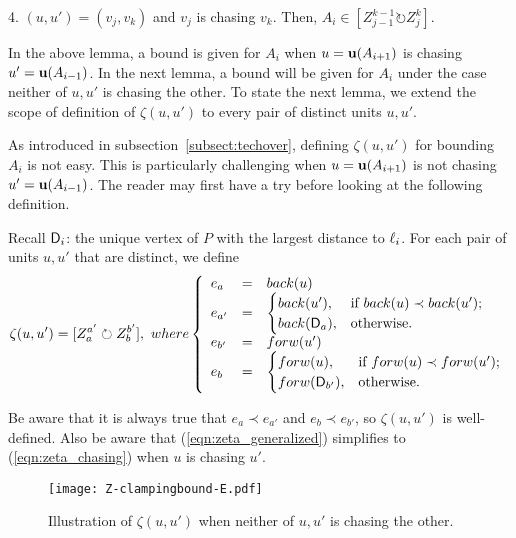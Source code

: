\documentclass{ws-ijcga}
\begin{document}
4. $(u,u')=(v_j,v_k)$ and $v_j$ is chasing $v_k$. Then, $A_i\in [Z_{j-1}^{k-1}\circlearrowright Z_j^k]$.

\bigskip In the above lemma, a bound is given for $A_i$ when $u=\mathbf{u}(A_{i+1})$ is chasing $u'=\mathbf{u}(A_{i-1})$.
 In the next lemma, a bound will be given for $A_i$ under the case neither of $u,u'$ is chasing the other.
 To state the next lemma, we extend the scope of definition of $\zeta(u,u')$ to every pair of distinct units $u,u'$.

\begin{remark}
As introduced in subsection~\ref{subsect:techover}, defining $\zeta(u,u')$ for bounding $A_i$ is not easy.
  This is particularly challenging when $u=\mathbf{u}(A_{i+1})$ is not chasing $u'=\mathbf{u}(A_{i-1})$.
The reader may first have a try before looking at the following definition.
\end{remark}

\begin{definition}\label{def:zeta-extended}
Recall $\mathsf{D}_i$: the unique vertex of $P$ with the largest distance to $\ell_i$.
For each pair of units $u,u'$ that are distinct, we define
\begin{equation}\label{eqn:zeta_generalized}
\zeta(u,u') = [Z_{a}^{a'}\circlearrowright Z_{b}^{b'}],
~where
\left\{\begin{array}{lcl}
e_a & = & back(u) \\
e_{a'} & = & \begin{cases}
            back(u'), & \hbox{if } back(u) \prec back(u'); \\
            back(\mathsf{D}_a), & \hbox{otherwise}.
          \end{cases}\\
e_{b'} & = & forw(u')\\
e_b & = & \begin{cases}
            forw(u), & \hbox{if } forw(u) \prec forw(u'); \\
            forw(\mathsf{D}_{b'}), & \hbox{otherwise}.
        \end{cases}
\end{array}\right.
\end{equation}
\end{definition}

Be aware that it is always true that $e_a\prec e_{a'}$ and $e_b\prec e_{b'}$, so $\zeta(u,u')$ is well-defined.
Also be aware that (\ref{eqn:zeta_generalized}) simplifies to (\ref{eqn:zeta_chasing}) when $u$ is chasing $u'$.

\begin{figure}[h]
  \centering\texttt{[image: Z-clampingbound-E.pdf]}
  \caption{Illustration of $\zeta(u,u')$ when neither of $u,u'$ is chasing the other.}\label{fig:zeta2}
\end{figure}
\end{document}
